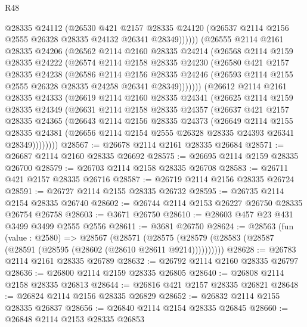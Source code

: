 \begin{lexlean}{R48}
\begin{coremodule}
            @28335
            @24112
            (@26530
              @421
              @2157
              @28335
              @24120
              (@26537 @2114 @2156 @2555 @26328 @28335 @24132 @26341 @28349))))))
    (@26555
      @2114
      @2161
      @28335
      @24206
      (@26562
        @2114
        @2160
        @28335
        @24214
        (@26568
          @2114
          @2159
          @28335
          @24222
          (@26574
            @2114
            @2158
            @28335
            @24230
            (@26580
              @421
              @2157
              @28335
              @24238
              (@26586
                @2114
                @2156
                @28335
                @24246
                (@26593 @2114 @2155 @2555 @26328 @28335 @24258 @26341 @28349)))))))
    (@26612
      @2114
      @2161
      @28335
      @24333
      (@26619
        @2114
        @2160
        @28335
        @24341
        (@26625
          @2114
          @2159
          @28335
          @24349
          (@26631
            @2114
            @2158
            @28335
            @24357
            (@26637
              @421
              @2157
              @28335
              @24365
              (@26643
                @2114
                @2156
                @28335
                @24373
                (@26649
                  @2114
                  @2155
                  @28335
                  @24381
                  (@26656 @2114 @2154 @2555 @26328 @28335 @24393 @26341 @28349))))))))
@28567 := @26678 @2114 @2161 @28335 @26684
@28571 := @26687 @2114 @2160 @28335 @26692
@28575 := @26695 @2114 @2159 @28335 @26700
@28579 := @26703 @2114 @2158 @28335 @26708
@28583 := @26711 @421 @2157 @28335 @26716
@28587 := @26719 @2114 @2156 @28335 @26724
@28591 := @26727 @2114 @2155 @28335 @26732
@28595 := @26735 @2114 @2154 @28335 @26740
@28602 := @26744 @2114 @2153 @26227 @26750 @28335 @26754 @26758
@28603 := @3671 @26750
@28610 := @28603 @457 @23 @431 @3499 @3499 @2555 @2556
@28611 := @3681 @26750
@28624 := @28563
    (fun (value : @2580) =>
    @28567
      (@28571 (@28575 (@28579 (@28583 (@28587 (@28591 (@28595 (@28602 (@28610 @28611 @9214))))))))))
@28628 := @26783 @2114 @2161 @28335 @26789
@28632 := @26792 @2114 @2160 @28335 @26797
@28636 := @26800 @2114 @2159 @28335 @26805
@28640 := @26808 @2114 @2158 @28335 @26813
@28644 := @26816 @421 @2157 @28335 @26821
@28648 := @26824 @2114 @2156 @28335 @26829
@28652 := @26832 @2114 @2155 @28335 @26837
@28656 := @26840 @2114 @2154 @28335 @26845
@28660 := @26848 @2114 @2153 @28335 @26853

\end{coremodule}
\end{lexlean}
